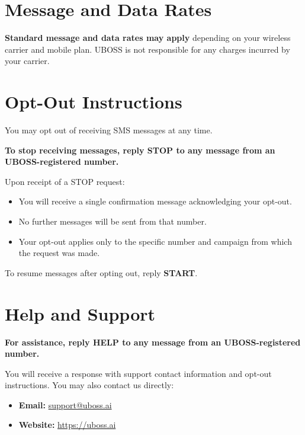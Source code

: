 \documentclass[11pt]{article}
\begin{document}
\section{Message and Data Rates}

\textbf{Standard message and data rates may apply} depending on your wireless carrier and mobile plan. UBOSS is not responsible for any charges incurred by your carrier.

\section{Opt-Out Instructions}

You may opt out of receiving SMS messages at any time.

\begin{center}
    \textbf{To stop receiving messages, reply \textsf{STOP} to any message from an UBOSS-registered number.}
\end{center}

Upon receipt of a STOP request:
\begin{itemize}[leftmargin=2em]
    \item You will receive a single confirmation message acknowledging your opt-out.
    \item No further messages will be sent from that number.
    \item Your opt-out applies only to the specific number and campaign from which the request was made.
\end{itemize}

To resume messages after opting out, reply \textbf{START}.

\section{Help and Support}

\begin{center}
    \textbf{For assistance, reply \textsf{HELP} to any message from an UBOSS-registered number.}
\end{center}

You will receive a response with support contact information and opt-out instructions. You may also contact us directly:

\begin{itemize}[leftmargin=2em]
    \item \textbf{Email:} \href{mailto:support@uboss.ai}{support@uboss.ai}
    \item \textbf{Website:} \url{https://uboss.ai}
\end{itemize}
\end{document}
